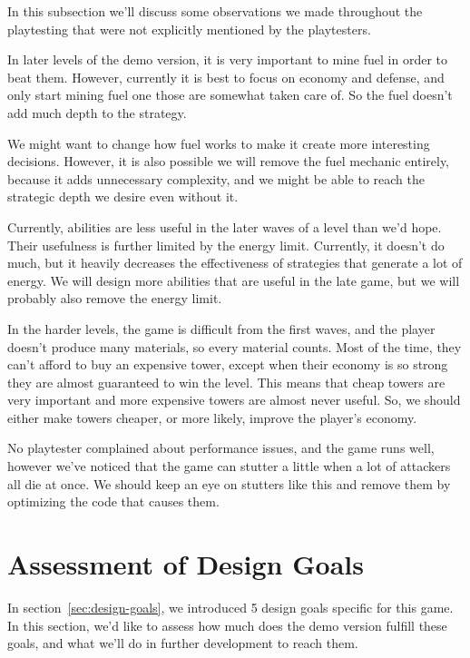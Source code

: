 In this subsection we'll discuss some observations we made throughout the playtesting that were not explicitly mentioned by the playtesters.

In later levels of the demo version, it is very important to mine fuel in order to beat them.
However, currently it is best to focus on economy and defense, and only start mining fuel one those are somewhat taken care of.
So the fuel doesn't add much depth to the strategy.

We might want to change how fuel works to make it create more interesting decisions.
However, it is also possible we will remove the fuel mechanic entirely, because it adds unnecessary complexity, and we might be able to reach the strategic depth we desire even without it.

Currently, abilities are less useful in the later waves of a level than we'd hope.
Their usefulness is further limited by the energy limit.
Currently, it doesn't do much, but it heavily decreases the effectiveness of strategies that generate a lot of energy.
We will design more abilities that are useful in the late game, but we will probably also remove the energy limit.

In the harder levels, the game is difficult from the first waves, and the player doesn't produce many materials, so every material counts.
Most of the time, they can't afford to buy an expensive tower, except when their economy is so strong they are almost guaranteed to win the level.
This means that cheap towers are very important and more expensive towers are almost never useful.
So, we should either make towers cheaper, or more likely, improve the player's economy.

No playtester complained about performance issues, and the game runs well, however we've noticed that the game can stutter a little when a lot of attackers all die at once.
We should keep an eye on stutters like this and remove them by optimizing the code that causes them.

\section{Assessment of Design Goals}

In section~\ref{sec:design-goals}, we introduced 5 design goals specific for this game.
In this section, we'd like to assess how much does the demo version fulfill these goals, and what we'll do in further development to reach them.

